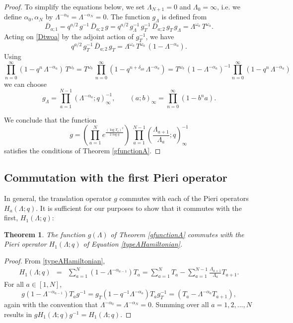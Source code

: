 \documentclass[12pt]{amsart}
\newtheorem{thm}{Theorem}[section]
\numberwithin{equation}{section}
\begin{document}
\begin{proof}
To simplify the equations below, we set $\Lambda_{N+1}=0$ and $\Lambda_0=\infty$, i.e. we define $\alpha_0,\alpha_N$ by $\Lambda^{-\alpha_0}=\Lambda^{-\alpha_N}=0$.
The function $g_\Lambda$ is defined from
\begin{equation}\label{dtwotodone}
\bar D_{a;1}=q^{a/2}\,g^{-1}\,\bar  D_{a;2} \,g = q^{a/2} \,g_\Lambda^{-1} \,g_T^{-1} \,\bar D_{a;2}\,g_T\, g_\Lambda =  \Lambda^{\omega_a} \,T^{\omega_a}.
\end{equation}
Acting on \eqref{Dtwoa} by the adjoint action of $g_T^{-1}$, we have
$$
q^{a/2} \,g_T^{-1}\,\bar  D_{a;2} \,g_T = \Lambda^{\omega_a}\, T^{\omega_a} \,(1-\Lambda^{-\alpha_a}).
$$
Using 
$$
\prod_{n=0}^\infty (1-q^n \,\Lambda^{-\alpha_a}) \,T^{\omega_b} = T^{\omega_b} \,\prod_{n=0}^\infty (1-q^{n+\delta_{ab}} \,\Lambda^{-\alpha_a}) = T^{\omega_b} \, (1-\Lambda^{-\alpha_a})^{-1}\prod_{n=0}^\infty (1-q^n \,\Lambda^{-\alpha_a})
$$
we can choose
\begin{equation}\label{glambdavalue}
g_\Lambda = \prod_{a=1}^{N-1} (\Lambda^{-\alpha_a};q)_\infty^{-1},\qquad (a;b)_\infty = \prod_{n=0}^{\infty} (1-b^n a).
\end{equation}

We conclude that the function
\begin{equation}\label{gtypeA}
g=\left(\prod_{a=1}^N e^{\frac{(\log T_a)^2}{2\log q}}\right)\  \prod_{a=1}^{N-1}\left( \frac{\Lambda_{a+1}}{\Lambda_a};q\right)_\infty^{-1}
\end{equation}
satisfies the conditions of Theorem \ref{gfunctionA}.
\end{proof}

\subsection{Commutation with the first Pieri operator}\label{sec:28}
In general,  the translation operator $g$ commutes with each of the Pieri operators $H_a(\Lambda;q)$. It is sufficient for our purposes to show that it commutes with the first, $H_1(\Lambda;q)$:
\begin{thm}\label{commutationtypeA}
The function $g(\Lambda)$ of Theorem \ref{gfunctionA} commutes with the Pieri operator 
$H_1(\Lambda;q)$ of Equation \eqref{typeAHamiltonian}.
\end{thm}
\begin{proof}
From \eqref{typeAHamiltonian},
\begin{eqnarray*}
H_1(\Lambda;q) &=& \sum_{a=1}^{N} (1-\Lambda^{-\alpha_{a-1}}) T_{a} = \sum_{a=1}^N T_a - \sum_{a=1}^{N-1} \frac{\Lambda_{a+1}}{\Lambda_{a}} T_{a+1}.
\end{eqnarray*}
For all $a\in[1,N]$,
$$ g (1-\Lambda^{-\alpha_{a-1}})T_a g^{-1}= g_T(1-q^{-1}\Lambda^{-\alpha_{a}}) T_a g_T^{-1}
= (T_a - \Lambda^{-\alpha_a} T_{a+1}) ,
$$
again with the convention that $\Lambda^{-\alpha_0}=\Lambda^{-\alpha_N}=0$.
Summing over all $a=1,2,...,N$ results in $g H_1(\Lambda;q) g^{-1}=H_1(\Lambda;q)$.
\end{proof}
\end{document}
